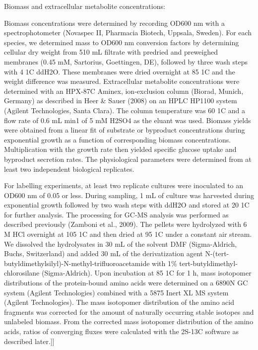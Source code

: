 \documentclass{bmcart}
\begin{document}
Biomass and extracellular metabolite
concentrations:


Biomass concentrations were determined by recording
OD600 nm with a spectrophotometer (Novaspec II, Pharmacia
Biotech, Uppsala, Sweden). For each species, we determined
mass to OD600 nm conversion factors by determining
cellular dry weight from 510 mL filtrate with predried and
preweighed membranes (0.45 mM, Sartorius, Goettingen,
DE), followed by three wash steps with 4 1C ddH2O. These
membranes were dried overnight at 85 1C and the weight
difference was measured.
Extracellular metabolite concentrations were determined
with an HPX-87C Aminex, ion-exclusion column (Biorad,
Munich, Germany) as described in Heer \& Sauer (2008) on
an HPLC HP1100 system (Agilent Technologies, Santa
Clara). The column temperature was 60 1C and a flow rate
of 0.6 mL min1 of 5 mM H2SO4 as the eluant was used.
Biomass yields were obtained from a linear fit of substrate
or byproduct concentrations during exponential growth as a
function of corresponding biomass concentrations. Multiplication
with the growth rate then yielded specific glucose
uptake and byproduct secretion rates. The physiological
parameters were determined from at least two independent
biological replicates.


For labelling experiments, at least two replicate cultures were
inoculated to an OD600 nm of 0.05 or less. During sampling,
1 mL of culture was harvested during exponential growth
followed by two wash steps with ddH2O and stored at
 20 1C for further analysis. The processing for GC-MS
analysis was performed as described previously (Zamboni
et al., 2009). The pellets were hydrolyzed with 6 M HCl
overnight at 105 1C and then dried at 95 1C under a constant
air stream. We dissolved the hydrolysates in 30 mL of the
solvent DMF (Sigma-Aldrich, Buchs, Switzerland) and
added 30 mL of the derivatization agent N-(tert-butyldimethylsilyl)-N-methyl-trifluoroacetamide
with 1\% tert-butyldimethyl-chlorosilane
(Sigma-Aldrich). Upon incubation
at 85 1C for 1 h, mass isotopomer distributions of the
protein-bound amino acids were determined on a 6890N
GC system (Agilent Technologies) combined with a 5875
Inert XL MS system (Agilent Technologies).
The mass isotopomer distribution of the amino acid
fragments was corrected for the amount of naturally occurring
stable isotopes and unlabeled biomass. From the corrected
mass isotopomer distribution of the amino acids, ratios of
converging fluxes were calculated with the 2S-13C software as described later.]]
\end{document}
